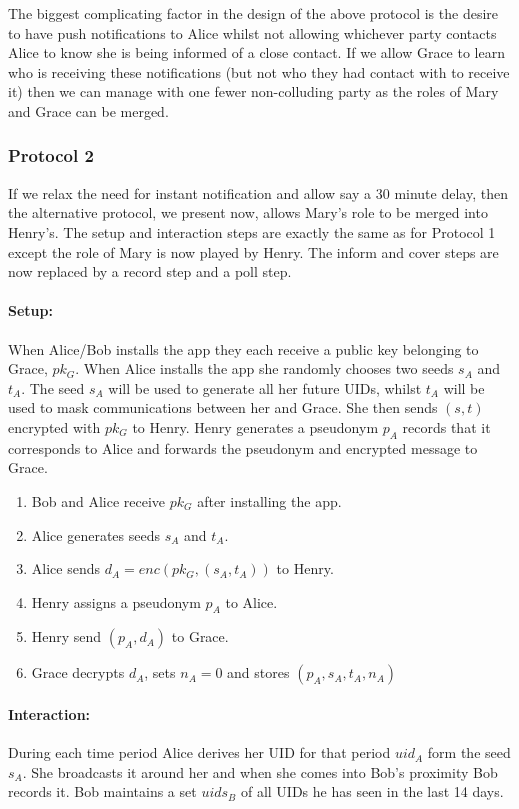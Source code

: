 \documentclass{article}
\begin{document}
The biggest complicating factor in the design of the above protocol is the desire to have push notifications to Alice whilst not allowing whichever party contacts Alice to know she is being informed of a close contact. If we allow Grace to learn who is receiving these notifications (but not who they had contact with to receive it) then we can manage with one fewer non-colluding party as the roles of Mary and Grace can be merged.

\subsubsection{Protocol 2}

If we relax the need for instant notification and allow say a 30 minute delay, then the alternative protocol, we present now, allows Mary's role to be merged into Henry's. The setup and interaction steps are exactly the same as for Protocol 1 except the role of Mary is now played by Henry. The inform and cover steps are now replaced by a record step and a poll step.


\paragraph{Setup:}
When Alice/Bob installs the app they each receive a public key belonging to Grace, $pk_G$. When Alice installs the app she randomly chooses two seeds $s_A$ and $t_A$. The seed $s_A$ will be used to generate all her future UIDs, whilst $t_A$ will be used to mask communications between her and Grace. She then sends $(s,t)$ encrypted with $pk_G$ to Henry. Henry generates a pseudonym $p_A$ records that it corresponds to Alice and forwards the pseudonym and encrypted message to Grace.

\begin{enumerate}
    \item Bob and Alice receive $pk_G$ after installing the app.
    \item Alice generates seeds $s_A$ and $t_A$.
    \item Alice sends $d_A=\mathit{enc(pk_G,(s_A,t_A))}$ to Henry.
    \item Henry assigns a pseudonym $p_A$ to Alice.
    \item Henry send $(p_A,d_A)$ to Grace.
    \item Grace decrypts $d_A$, sets $n_A=0$ and stores $(p_A,s_A,t_A,n_A)$
\end{enumerate}

\paragraph{Interaction:}
During each time period Alice derives her UID for that period $uid_A$ form the seed $s_A$. She broadcasts it around her and when she comes into Bob's proximity Bob records it. Bob maintains a set $uids_B$ of all UIDs he has seen in the last 14 days.
\end{document}
